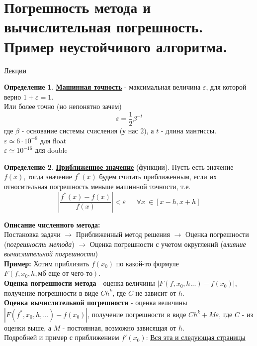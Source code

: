 \documentclass[specialist, subf, href, colorlinks=true, 12pt, times, mtpro, final]{disser}
\theoremstyle{definition}
\newtheorem{defn}{Определение}[section]
\begin{document}
\tableofcontents

\section {Погрешность метода и вычислительная погрешность. Пример неустойчивого алгоритма.}
    \hyperlink {lects.12}{Лекции} \\
    \begin{defn}
    	\textbf{\hyperlink {lects.13}{Машинная точность}} - максимальная величина $\varepsilon$, для которой верно $1+\varepsilon=1$. \\
    	Или более точно (но непонятно зачем)
    	$$
    		\varepsilon = \frac{1}{2}\beta^{-t}
    	$$
    	где $\beta$ - основание системы счисления (у нас 2), а $t$ - длина мантиссы.\\
    	$\varepsilon \simeq 6 \cdot 10^{-8}$ для float\\
    	$\varepsilon \simeq 10^{-16}$ для double
    \end{defn}
	\begin{defn}
		\textbf{\hyperlink {lects.13}{Приближенное значение}} (функции). Пусть есть значение $f(x)$, тогда значение $f^*(x)$ будем считать приближенным, если их относительная погрешность меньше машинной точности, т.е.
		$$
			\left| \frac{f^*(x) - f(x)}{f(x)} \right| < \varepsilon \ \ \ \ \ \ \ \forall x \ \in [x-h,x+h]
		$$
	\end{defn}
    \textbf{Описание численного метода:}\\
    Постановка задачи $\rightarrow$ Приближенный метод решения $\rightarrow$ Оценка погрешности (\textit{погрешность метода}) $\rightarrow$ Оценка погрешности с учетом округлений (\textit{влияние вычислительной погрешности})  \\
    \textbf{Пример:} Хотим приблизить $f(x_0)$ по какой-то формуле $F(f, x_0, h, \text{мб еще от чего-то})$. \\
    \textbf{Оценка погрешности метода} - оценка  величины $|F(f,x_0,h...) - f(x_0)|$, получение погрешности в виде $Ch^k$, где $C$ не зависит от $h$. \\
    \textbf{Оценка вычислительной погрешности} - оценка величины $|F(f^*, x_0, h, ...) - f(x_0)|$, получение погрешности в виде $Ch^k + M\varepsilon$, где $C$ - из оценки выше, а $M$ - постоянная, возможно зависящая от $h$.\\
    Подробней и пример с приближением $f'(x_0)$: \hyperlink {lects.12}{Вся эта и следующая страницы}
\end{document}

